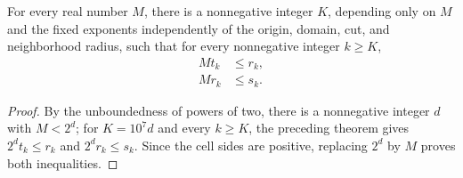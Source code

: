 \begin{lemma}
    \label{thm:area_law_uniform_scale_separation}
    \leanok
    For every real number $M$, there is a nonnegative integer $K$, depending
    only on $M$ and the fixed exponents independently of the origin, domain,
    cut, and neighborhood radius, such
    that for every nonnegative integer $k\ge K$,
    \begin{align}
        M t_k & \le r_k, \\
        M r_k & \le s_k.
    \end{align}
\end{lemma}
\begin{proof}\leanok
    By the unboundedness of powers of two, there is a nonnegative integer $d$
    with $M<2^d$; for $K=10^7d$ and every $k\ge K$,
    the preceding theorem gives $2^dt_k\le r_k$ and
    $2^dr_k\le s_k$. Since the cell sides are positive, replacing $2^d$ by $M$
    proves both inequalities.
\end{proof}
